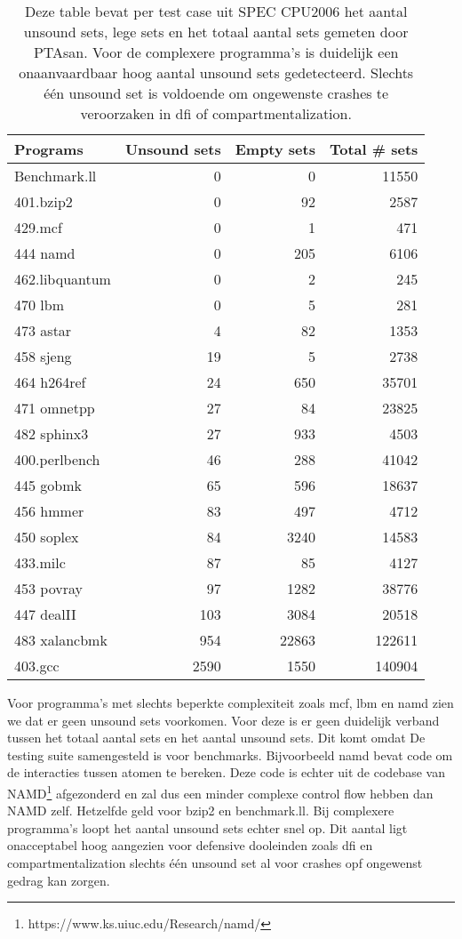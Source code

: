 \documentclass[conference]{IEEEtran}
\begin{document}
\begin{table}[htbp]
    \begin{center}
\begin{tabular}{|l|rr|r|}
\hline
Programs       & Unsound sets & Empty sets & Total \# sets \\ 
\hline
\hline
Benchmark.ll   & 0   & 0     & 11550 \\ 
401.bzip2      & 0   & 92    & 2587  \\ 
429.mcf        & 0   & 1     & 471   \\ 
444 namd       & 0   & 205   & 6106  \\ 
462.libquantum & 0   & 2     & 245   \\ 
470 lbm        & 0   & 5     & 281   \\ 
473 astar      & 4   & 82    & 1353  \\ 
458 sjeng      & 19  & 5     & 2738  \\ 
464 h264ref    & 24  & 650   & 35701 \\ 
471 omnetpp    & 27  & 84    & 23825 \\ 
482 sphinx3    & 27  & 933   & 4503  \\ 
400.perlbench  & 46  & 288   & 41042 \\ 
445 gobmk      & 65  & 596   & 18637 \\ 
456 hmmer      & 83  & 497   & 4712  \\ 
450 soplex     & 84  & 3240  & 14583 \\ 
433.milc       & 87  & 85    & 4127  \\ 
453 povray     & 97  & 1282  & 38776 \\ 
447 dealII     & 103 & 3084  & 20518 \\ 
483 xalancbmk  & 954 & 22863 & 122611\\ 
403.gcc        & 2590& 1550  & 140904\\ 
\hline
\end{tabular}
\end{center}
\caption{
Deze table bevat per test case uit SPEC CPU2006 het aantal unsound sets, lege sets en het totaal aantal sets gemeten door PTAsan. Voor de complexere programma's is duidelijk een onaanvaardbaar hoog aantal unsound sets gedetecteerd. Slechts één unsound set is voldoende om ongewenste crashes te veroorzaken in \gls{dfi} of compartmentalization.
}
\end{table}

Voor programma's met slechts beperkte complexiteit zoals mcf, lbm en namd zien we dat er geen unsound sets voorkomen. Voor deze is er geen duidelijk verband tussen het totaal aantal sets en het aantal unsound sets. Dit komt omdat De testing suite samengesteld is voor benchmarks. Bijvoorbeeld namd bevat code om de interacties tussen atomen te bereken. Deze code is echter uit de codebase van NAMD\footnote{https://www.ks.uiuc.edu/Research/namd/} afgezonderd en zal dus een minder complexe control flow hebben dan NAMD zelf. Hetzelfde geld voor bzip2 en benchmark.ll. Bij complexere programma's loopt het aantal unsound sets echter snel op. Dit aantal ligt onacceptabel hoog aangezien voor defensive dooleinden zoals \gls{dfi} en compartmentalization\cite{lefeuvre_sok_2024} slechts één unsound set al voor crashes opf ongewenst gedrag kan zorgen. 
\end{document}
